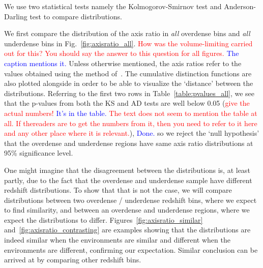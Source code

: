 \documentclass[twocolumn,useAMS,usenatbib]{mn2e}
\newcommand{\rachel}[1]{{\textcolor{red}{#1}}}
\newcommand{\arun}[1]{{\textcolor{blue}{#1}}}
\begin{document}
We use two statistical tests namely the Kolmogorov-Smirnov test and Anderson-Darling test to compare distributions.

We first compare the distribution of the axis ratio in \emph{all}
overdense bins and \emph{all} underdense bins in Fig.~\ref{fig:axisratio_all}.
\rachel{How was the volume-limiting carried out for this?  You should say the answer to this question  for all figures.} 
\arun{The caption mentions it.}
Unless otherwise mentioned, the axis ratios refer to the values obtained using the method of~\cite{Claire_Fits}.
The cumulative distinction functions are also plotted alongside in order to be able to visualize the `distance' between the distributions.
Referring to the first two rows in Table~\ref{table:pvalues_all}, we see that the p-values from both the KS and AD tests are well below 0.05
(\rachel{give the actual numbers!} 
\arun{It's in the table.} 
\rachel{The text does not seem to mention the table at all.  If thereaders are to get the numbers from it, then you need to refer to it here and any other place where it is relevant.}), 
\arun{Done.}
so we reject the `null hypothesis' that the overdense and underdense regions have same axis ratio distributions at 95\% significance level.

One might imagine that the disagreement between the distributions is, at least partly, due to the fact that the overdense and underdense sample have different redshift distributions.
To show that that is not the case, we will compare distributions between two overdense / underdense redshift bins, where we expect to find similarity, and between an overdense and underdense regions,
where we expect the distributions to differ.
Figures~\ref{fig:axisratio_similar} and~\ref{fig:axisratio_contrasting} are examples showing that the distributions are indeed similar when the environments are similar and different when the environments are different, confirming our expectation.
Similar conclusion can be arrived at by comparing other redshift bins.
\end{document}
